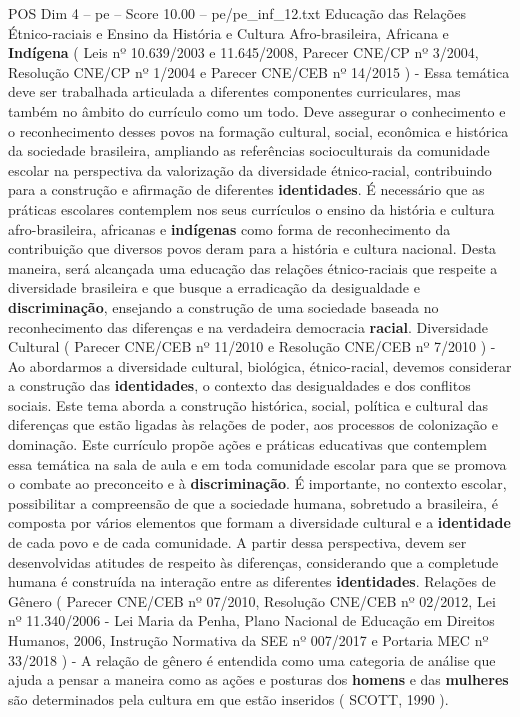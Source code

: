 \begin{textsample}{POS Dim 4 – pe – Score 10.00 – pe/pe\_inf\_12.txt}
Educação das Relações Étnico-raciais e Ensino da História e Cultura Afro-brasileira, Africana e \textbf{Indígena} ( Leis nº 10.639/2003 e 11.645/2008, Parecer CNE/CP nº 3/2004, Resolução CNE/CP nº 1/2004 e Parecer CNE/CEB nº 14/2015 ) - Essa temática deve ser trabalhada articulada a diferentes componentes curriculares, mas também no âmbito do currículo como um todo.
Deve assegurar o conhecimento e o reconhecimento desses povos na formação cultural, social, econômica e histórica da sociedade brasileira, ampliando as referências socioculturais da comunidade escolar na perspectiva da valorização da diversidade étnico-racial, contribuindo para a construção e afirmação de diferentes \textbf{identidades}.
É necessário que as práticas escolares contemplem nos seus currículos o ensino da história e cultura afro-brasileira, africanas e \textbf{indígenas} como forma de reconhecimento da contribuição que diversos povos deram para a história e cultura nacional.
Desta maneira, será alcançada uma educação das relações étnico-raciais que respeite a diversidade brasileira e que busque a erradicação da desigualdade e \textbf{discriminação}, ensejando a construção de uma sociedade baseada no reconhecimento das diferenças e na verdadeira democracia \textbf{racial}.
Diversidade Cultural ( Parecer CNE/CEB nº 11/2010 e Resolução CNE/CEB nº 7/2010 ) - Ao abordarmos a diversidade cultural, biológica, étnico-racial, devemos considerar a construção das \textbf{identidades}, o contexto das desigualdades e dos conflitos sociais.
Este tema aborda a construção histórica, social, política e cultural das diferenças que estão ligadas às relações de poder, aos processos de colonização e dominação.
Este currículo propõe ações e práticas educativas que contemplem essa temática na sala de aula e em toda comunidade escolar para que se promova o combate ao preconceito e à \textbf{discriminação}.
É importante, no contexto escolar, possibilitar a compreensão de que a sociedade humana, sobretudo a brasileira, é composta por vários elementos que formam a diversidade cultural e a \textbf{identidade} de cada povo e de cada comunidade.
A partir dessa perspectiva, devem ser desenvolvidas atitudes de respeito às diferenças, considerando que a completude humana é construída na interação entre as diferentes \textbf{identidades}.
Relações de Gênero ( Parecer CNE/CEB nº 07/2010, Resolução CNE/CEB nº 02/2012, Lei nº 11.340/2006 - Lei Maria da Penha, Plano Nacional de Educação em Direitos Humanos, 2006, Instrução Normativa da SEE nº 007/2017 e Portaria MEC nº 33/2018 ) - A relação de gênero é entendida como uma categoria de análise que ajuda a pensar a maneira como as ações e posturas dos \textbf{homens} e das \textbf{mulheres} são determinados pela cultura em que estão inseridos ( SCOTT, 1990 ).

\end{textsample}
